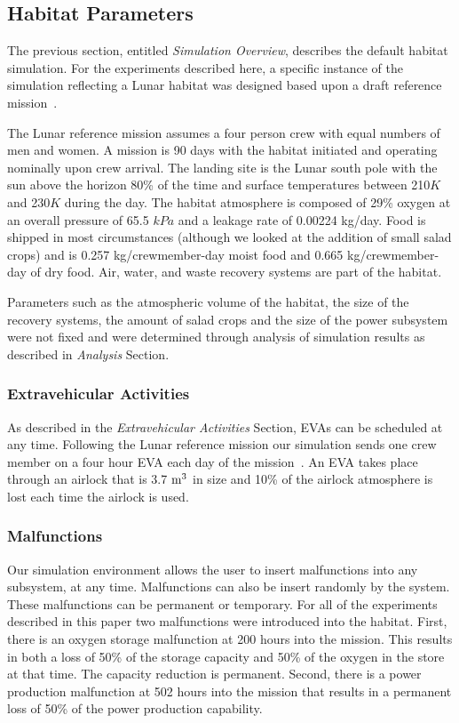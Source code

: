 \documentclass[submit]{aiaa}
\begin{document}
\subsection{Habitat Parameters}
\label{sec:hab}

The previous section, entitled \emph{Simulation Overview}, %
describes the default habitat simulation.  
For the experiments described here, a specific instance of the simulation reflecting a Lunar habitat was designed based upon a draft reference mission~\cite{hanford04}.

The Lunar reference mission assumes a four person crew with equal numbers of
men and women.  A mission is 90 days with the habitat initiated and
operating nominally upon crew arrival.  The landing site is the Lunar
south pole with the sun above the horizon 80\% of the time and surface
temperatures between 210$K$ and 230$K$ during the day.  The habitat
atmosphere is composed of 29\% oxygen at an overall pressure of 65.5
$kPa$ and a leakage rate of 0.00224 kg/day.  Food is shipped in most
circumstances (although we looked at the addition of small salad
crops) and is 0.257 kg/crewmember-day moist food and 0.665
kg/crewmember-day of dry food.  Air, water, and waste recovery systems
are part of the habitat.

Parameters such as the atmospheric volume of the habitat, the size of the recovery systems, the amount of salad crops and the
size of the power subsystem were not fixed and were determined through
analysis of simulation results as described in \emph{Analysis} Section.%

\subsubsection{Extravehicular Activities}

As described in the \emph{Extravehicular Activities} Section, %
EVAs can be scheduled at any time.
Following the Lunar reference mission our simulation sends one crew
member on a four hour EVA each day of the mission~\cite{hanford04}.  An EVA takes place
through an airlock that is 3.7 ${\rm m}^3$ in size and 10\% of the airlock
atmosphere is lost each time the airlock is used.  

\subsubsection{Malfunctions}

Our simulation environment allows the user to insert  malfunctions into any
subsystem, at any time.
Malfunctions can also be insert randomly by the system.
These malfunctions can be permanent or temporary.  For all of the
experiments described in this paper two malfunctions were introduced
into the habitat.  First, there is an oxygen storage malfunction
at 200 hours into the mission.  This results in both a loss of 50\% of
the storage capacity and 50\% of the oxygen in the store at that time.
The capacity reduction is permanent.  Second, there is a power
production malfunction at 502 hours into the mission that results in a
permanent loss of 50\% of the power production capability.
\end{document}
